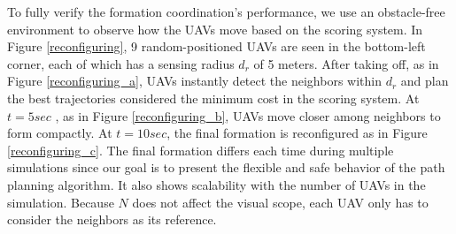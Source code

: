 To fully verify the formation coordination's performance, we use an obstacle-free environment to observe how the UAVs move based on the scoring system. In Figure \ref{reconfiguring}, 9 random-positioned UAVs are seen in the bottom-left corner, each of which has a sensing radius $d_{r}$ of 5 meters. After taking off, as in Figure \ref{reconfiguring_a}, UAVs instantly detect the neighbors within $d_{r}$ and plan the best trajectories considered the minimum cost in the scoring system. At $t= 5 sec$ , as in Figure \ref{reconfiguring_b}, UAVs move closer among neighbors to form compactly. At $t= 10 sec$, the final formation is reconfigured as in Figure \ref{reconfiguring_c}. The final formation differs each time during multiple simulations since our goal is to present the flexible and safe behavior of the path planning algorithm. It also shows scalability with the number of UAVs in the simulation. Because $N$ does not affect the visual scope, each UAV only has to consider the neighbors as its reference. 


